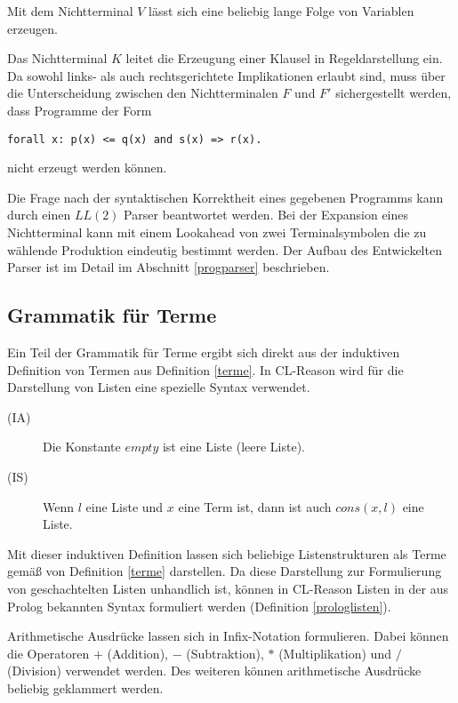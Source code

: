 Mit dem Nichtterminal $V$ lässt sich eine beliebig lange Folge von Variablen erzeugen.

Das Nichtterminal $K$ leitet die Erzeugung einer Klausel in Regeldarstellung ein. Da sowohl links- als auch rechtsgerichtete Implikationen erlaubt sind, muss über die Unterscheidung zwischen den Nichtterminalen $F$ und $F'$ sichergestellt werden, dass Programme der Form

\begin{verbatim}
forall x: p(x) <= q(x) and s(x) => r(x).
\end{verbatim}
\noindent
nicht erzeugt werden können.

Die Frage nach der syntaktischen Korrektheit eines gegebenen Programms kann durch einen $LL(2)$ Parser beantwortet werden. Bei der Expansion eines Nichtterminal kann mit einem Lookahead von zwei Terminalsymbolen die zu wählende Produktion eindeutig bestimmt werden. Der Aufbau des Entwickelten Parser ist im Detail im Abschnitt \ref{progparser} beschrieben.

\subsection{Grammatik für Terme}
Ein Teil der Grammatik für Terme ergibt sich direkt aus der induktiven Definition von Termen aus Definition \ref{terme}. In CL-Reason wird für die Darstellung von Listen eine spezielle Syntax verwendet.

\begin{leftbar}
  \begin{definition}[Listen]
    \newline
    \begin{description}
    \item[(IA)] Die Konstante $empty$ ist eine Liste (leere Liste).
    \item[(IS)] Wenn $l$ eine Liste und $x$ eine Term ist, dann ist auch $cons(x,l)$ eine Liste.
    \end{description}
  \end{definition}
\end{leftbar}
\noindent
Mit dieser induktiven Definition lassen sich beliebige Listenstrukturen als Terme gemäß von Definition \ref{terme} darstellen. Da diese Darstellung zur Formulierung von geschachtelten Listen unhandlich ist, können in CL-Reason Listen in der aus Prolog bekannten Syntax formuliert werden (Definition \ref{prologlisten}).

Arithmetische Ausdrücke lassen sich in Infix-Notation formulieren. Dabei können die Operatoren $+$ (Addition), $-$ (Subtraktion), $*$ (Multiplikation) und $/$ (Division) verwendet werden. Des weiteren können arithmetische Ausdrücke beliebig geklammert werden.

